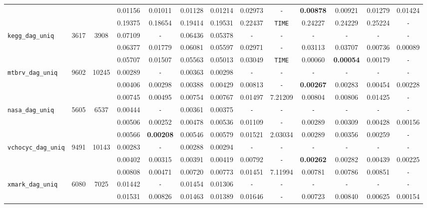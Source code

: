 \begin{table}
{\begin{tabular}{ l c c | c c c c c c c c c c }
 &  &  & 0.01156 & 0.01011 & 0.01128 & 0.01214 & 0.02973 & \verb|-| & \textbf{0.00878} & 0.00921 & 0.01279 & 0.01424 \\
 &  &  & 0.19375 & 0.18654 & 0.19414 & 0.19531 & 0.22437 & \verb|TIME| & 0.24227 & 0.24229 & 0.25224 & \verb|-| \\
\hline
\verb|kegg_dag_uniq| & 3617 & 3908 & 0.07109 & \verb|-| & 0.06436 & 0.05378 & \verb|-| & \verb|-| & \verb|-| & \verb|-| & \verb|-| & \verb|-| \\
 &  &  & 0.06377 & 0.01779 & 0.06081 & 0.05597 & 0.02971 & \verb|-| & 0.03113 & 0.03707 & 0.00736 & 0.00089 \\
 &  &  & 0.05707 & 0.01507 & 0.05563 & 0.05013 & 0.03049 & \verb|TIME| & 0.00060 & \textbf{0.00054} & 0.00179 & \verb|-| \\
\hline
\verb|mtbrv_dag_uniq| & 9602 & 10245 & 0.00289 & \verb|-| & 0.00363 & 0.00298 & \verb|-| & \verb|-| & \verb|-| & \verb|-| & \verb|-| & \verb|-| \\
 &  &  & 0.00406 & 0.00298 & 0.00388 & 0.00429 & 0.00813 & \verb|-| & \textbf{0.00267} & 0.00283 & 0.00454 & 0.00228 \\
 &  &  & 0.00745 & 0.00495 & 0.00754 & 0.00767 & 0.01497 & 7.21209 & 0.00804 & 0.00806 & 0.01425 & \verb|-| \\
\hline
\verb|nasa_dag_uniq| & 5605 & 6537 & 0.00444 & \verb|-| & 0.00361 & 0.00375 & \verb|-| & \verb|-| & \verb|-| & \verb|-| & \verb|-| & \verb|-| \\
 &  &  & 0.00506 & 0.00252 & 0.00478 & 0.00536 & 0.01109 & \verb|-| & 0.00289 & 0.00309 & 0.00428 & 0.00156 \\
 &  &  & 0.00566 & \textbf{0.00208} & 0.00546 & 0.00579 & 0.01521 & 2.03034 & 0.00289 & 0.00356 & 0.00259 & \verb|-| \\
\hline
\verb|vchocyc_dag_uniq| & 9491 & 10143 & 0.00283 & \verb|-| & 0.00288 & 0.00294 & \verb|-| & \verb|-| & \verb|-| & \verb|-| & \verb|-| & \verb|-| \\
 &  &  & 0.00402 & 0.00315 & 0.00391 & 0.00419 & 0.00792 & \verb|-| & \textbf{0.00262} & 0.00282 & 0.00439 & 0.00225 \\
 &  &  & 0.00808 & 0.00471 & 0.00720 & 0.00773 & 0.01451 & 7.11994 & 0.00781 & 0.00786 & 0.00851 & \verb|-| \\
\hline
\verb|xmark_dag_uniq| & 6080 & 7025 & 0.01442 & \verb|-| & 0.01454 & 0.01306 & \verb|-| & \verb|-| & \verb|-| & \verb|-| & \verb|-| & \verb|-| \\
 &  &  & 0.01531 & 0.00826 & 0.01463 & 0.01389 & 0.01646 & \verb|-| & 0.00723 & 0.00840 & 0.00625 & 0.00154 \\

\end{tabular}}
\end{table}
